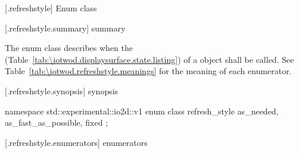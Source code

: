  [\iotwod.refreshstyle] {Enum class }

 [\iotwod.refreshstyle.summary] { summary}

\pnum
The  enum class describes when the  (Table~\ref{tab:\iotwod.displaysurface.state.listing}) of a  object shall be called. See Table~\ref{tab:\iotwod.refreshstyle.meanings} for the meaning of each  enumerator.

 [\iotwod.refreshstyle.synopsis] { synopsis}

\begin{codeblock}
namespace std::experimental::io2d::v1 {
  enum class refresh_style {
    as_needed,
    as_fast_as_possible,
    fixed
  };
}
\end{codeblock}

 [\iotwod.refreshstyle.enumerators] { enumerators}

